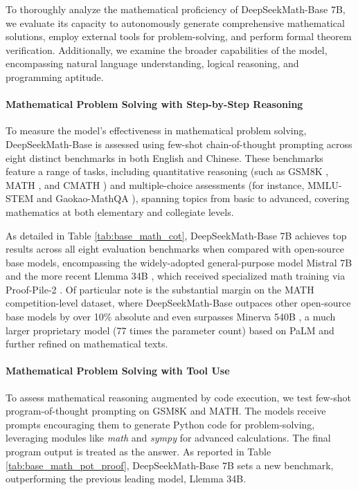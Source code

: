 To thoroughly analyze the mathematical proficiency of DeepSeekMath-Base 7B, we evaluate its capacity to autonomously generate comprehensive mathematical solutions, employ external tools for problem-solving, and perform formal theorem verification. Additionally, we examine the broader capabilities of the model, encompassing natural language understanding, logical reasoning, and programming aptitude.

\paragraph{Mathematical Problem Solving with Step-by-Step Reasoning}

To measure the model's effectiveness in mathematical problem solving, DeepSeekMath-Base is assessed using few-shot chain-of-thought prompting \citep{cot} across eight distinct benchmarks in both English and Chinese. These benchmarks feature a range of tasks, including quantitative reasoning (such as GSM8K \citep{gsm8k}, MATH \citep{MATH}, and CMATH \citep{wei2023cmath}) and multiple-choice assessments (for instance, MMLU-STEM \citep{mmlu} and Gaokao-MathQA \citep{agieval}), spanning topics from basic to advanced, covering mathematics at both elementary and collegiate levels.

As detailed in Table \ref{tab:base_math_cot}, DeepSeekMath-Base 7B achieves top results across all eight evaluation benchmarks when compared with open-source base models, encompassing the widely-adopted general-purpose model Mistral 7B \citep{mistral} and the more recent Llemma 34B \citep{llemma}, which received specialized math training via Proof-Pile-2 \citep{llemma}. Of particular note is the substantial margin on the MATH competition-level dataset, where DeepSeekMath-Base outpaces other open-source base models by over 10\% absolute and even surpasses Minerva 540B \citep{minerva}, a much larger proprietary model (77 times the parameter count) based on PaLM \citep{palm} and further refined on mathematical texts.

\paragraph{Mathematical Problem Solving with Tool Use} To assess mathematical reasoning augmented by code execution, we test few-shot program-of-thought prompting \citep{pot,pal} on GSM8K and MATH. The models receive prompts encouraging them to generate Python code for problem-solving, leveraging modules like \textit{math} and \textit{sympy} for advanced calculations. The final program output is treated as the answer. As reported in Table \ref{tab:base_math_pot_proof}, DeepSeekMath-Base 7B sets a new benchmark, outperforming the previous leading model, Llemma 34B.

